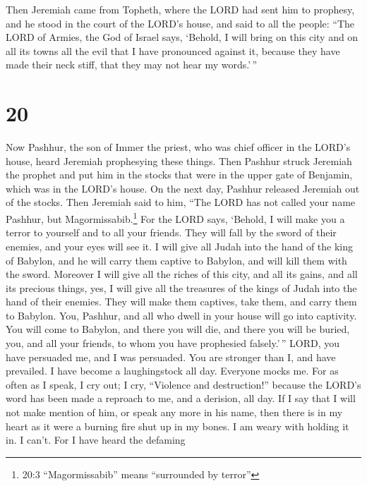  Then Jeremiah came from Topheth, where the LORD had sent
him to prophesy, and he stood in the court of the LORD's house, and said
to all the people:  ``The LORD of Armies, the God of Israel
says, `Behold, I will bring on this city and on all its towns all the
evil that I have pronounced against it, because they have made their
neck stiff, that they may not hear my words.'\,''

\hypertarget{section-19}{%
\section{20}\label{section-19}}

 Now Pashhur, the son of Immer the priest, who was chief
officer in the LORD's house, heard Jeremiah prophesying these things.
 Then Pashhur struck Jeremiah the prophet and put him in the
stocks that were in the upper gate of Benjamin, which was in the LORD's
house.  On the next day, Pashhur released Jeremiah out of
the stocks. Then Jeremiah said to him, ``The LORD has not called your
name Pashhur, but Magormissabib.\footnote{20:3 ``Magormissabib'' means
  ``surrounded by terror''}  For the LORD says, `Behold, I
will make you a terror to yourself and to all your friends. They will
fall by the sword of their enemies, and your eyes will see it. I will
give all Judah into the hand of the king of Babylon, and he will carry
them captive to Babylon, and will kill them with the sword. 
Moreover I will give all the riches of this city, and all its gains, and
all its precious things, yes, I will give all the treasures of the kings
of Judah into the hand of their enemies. They will make them captives,
take them, and carry them to Babylon.  You, Pashhur, and all
who dwell in your house will go into captivity. You will come to
Babylon, and there you will die, and there you will be buried, you, and
all your friends, to whom you have prophesied falsely.'\,'' 
LORD, you have persuaded me, and I was persuaded. You are stronger than
I, and have prevailed. I have become a laughingstock all day. Everyone
mocks me.  For as often as I speak, I cry out; I cry,
``Violence and destruction!'' because the LORD's word has been made a
reproach to me, and a derision, all day.  If I say that I
will not make mention of him, or speak any more in his name, then there
is in my heart as it were a burning fire shut up in my bones. I am weary
with holding it in. I can't.  For I have heard the defaming
